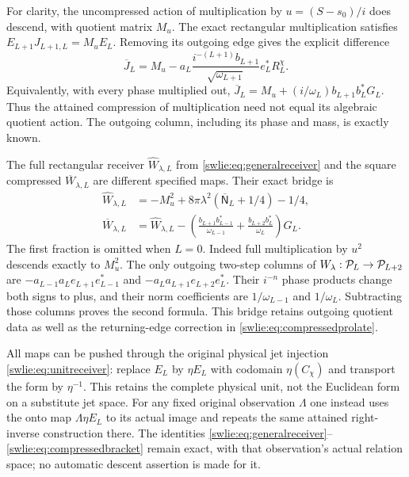 \documentclass[11pt]{article}
\begin{document}
For clarity, the uncompressed action of multiplication
by $u=(S-s_0)/i$ does descend, with quotient matrix $M_u$.
The exact rectangular multiplication satisfies
$E_{L+1}J_{L+1,L}=M_uE_L$. Removing its outgoing
edge gives the explicit difference
\begin{equation}\label{swlie:eq:Jquotient}
 \overline J_L=M_u-a_L
       \frac{i^{-(L+1)}b_{L+1}}{\sqrt{\omega_{L+1}}}
                                  e_L^*R_L^\chi.
\end{equation}
Equivalently, with every phase multiplied out,
$\overline J_L=M_u+(i/\omega_L)b_{L+1}b_L^*G_L$.
Thus the attained compression of multiplication need
not equal its algebraic quotient action. The outgoing
column, including its phase and mass, is exactly known.

The full rectangular receiver $\widehat W_{\lambda,L}$
from \eqref{swlie:eq:generalreceiver} and the square compressed
$\overline W_{\lambda,L}$ are different specified maps.
Their exact bridge is
\begin{equation}\label{swlie:eq:fullcompbridge}
 \begin{aligned}
 \widehat W_{\lambda,L}
   &=-M_u^2+8\pi\lambda^2(\overline{\mathsf N}_L+1/4)-1/4,\\
 \overline W_{\lambda,L}
   &=\widehat W_{\lambda,L}
     -\left(\frac{b_{L+1}b_{L-1}^*}{\omega_{L-1}}
             +\frac{b_{L+2}b_L^*}{\omega_L}\right)G_L .
 \end{aligned}
\end{equation}
The first fraction is omitted when $L=0$.
Indeed full multiplication by $u^2$ descends exactly to
$M_u^2$. The only outgoing two-step columns of
$W_\lambda:\mathcal P_L\to\mathcal P_{L+2}$ are
$-a_{L-1}a_Le_{L+1}e_{L-1}^*$
and $-a_La_{L+1}e_{L+2}e_L^*$.
Their $i^{-n}$ phase products change both signs to plus,
and their norm coefficients are $1/\omega_{L-1}$ and
$1/\omega_L$. Subtracting those columns proves the
second formula. This bridge retains outgoing quotient
data as well as the returning-edge correction in
\eqref{swlie:eq:compressedprolate}.

All maps can be pushed through the original physical
jet injection \eqref{swlie:eq:unitreceiver}: replace $E_L$
by $\eta E_L$ with codomain $\eta(C_\chi)$ and transport
the form by $\eta^{-1}$. This retains the complete
physical unit, not the Euclidean form on a substitute
jet space. For any fixed original observation $\Lambda$
one instead uses the onto map $\Lambda\eta E_L$
to its actual image and repeats the same attained
right-inverse construction there. The identities
\eqref{swlie:eq:generalreceiver}--\eqref{swlie:eq:compressedbracket}
remain exact, with that observation's actual relation
space; no automatic descent assertion is made for it.
\end{document}
